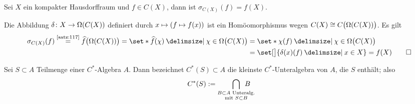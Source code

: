 \begin{bemerkung}[label=bem217,{name=[Spektrum von $f \in C(X)$ für $X$ kompakt]}]
	Sei $X$ ein kompakter Hausdorffraum und $f \in C(X)$, dann ist $\sigma_{C(X)}(f)=f(X)$.
\end{bemerkung}
\begin{beweis}
	Die Abbildung $\delta \colon X \to \Omega\enbrace*{C(X)}$ definiert durch $x \mapsto \enbrace*{f \mapsto f(x)}$ ist ein Homöomorphismus wegen $C(X) \cong C \enbrace[\big]{\Omega(C(X))}$. 
	Es gilt
	\begin{align}
		\sigma_{C(X)}(f) \StackText{\ref{satz:117}}{=} \widehat{f} \enbrace[\big]{\Omega(C(X))} = \set*{\widehat{f}(\chi) \given \chi \in \Omega \enbrace[\big]{C(X)}} 
		&= \set*{\chi(f) \given \chi \in \Omega \enbrace[\big]{C(X)}} \\
		&= \set[\big]{\delta(x)(f) \given x \in X} = f(X) \qedhere
	\end{align}
\end{beweis}

\begin{definition}[{name=[erzeuge C*-Algebra]}]
	Sei $S \subset A$ Teilmenge einer $C^*$-Algebra $A$.
	Dann bezeichnet $C^*(S) \subset A$ die kleinste $C^*$-Unteralgebra von $A$, die $S$ enthält; also
	\[
		C^*(S) := \smashoperator[r]{\bigcap_{\substack{B \subset A \text{ Unteralg.}\\ \text{mit } S \subset B}}} \enspace B
	\]
\end{definition}

